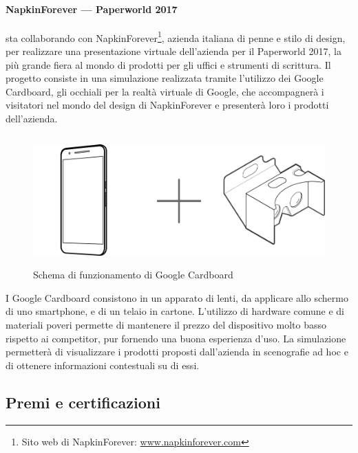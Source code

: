   \paragraph{NapkinForever --- Paperworld 2017}
   \nomeAzienda{} sta collaborando con NapkinForever\footnote{Sito web di NapkinForever: \href{www.napkinforever.com}{www.napkinforever.com}}, azienda italiana di penne e stilo di design, per realizzare una presentazione virtuale dell'azienda per il Paperworld 2017, la più grande fiera al mondo di prodotti per gli uffici e strumenti di scrittura. Il progetto consiste in una simulazione realizzata tramite l'utilizzo dei Google Cardboard, gli occhiali per la realtà virtuale di Google, che accompagnerà i visitatori nel mondo del design di NapkinForever e presenterà loro i prodotti dell'azienda.
   \begin{figure}[H]
      \begin{center}
         \includegraphics[width=15cm,height=5cm,keepaspectratio]{immagini/cardboard-schema}
      \end{center}
      \caption{Schema di funzionamento di Google Cardboard}\label{schemacardboard}
   \end{figure}
   I Google Cardboard consistono in un apparato di lenti, da applicare allo schermo di uno smartphone, e di un telaio in cartone. L'utilizzo di hardware comune e di materiali poveri permette di mantenere il prezzo del dispositivo molto basso rispetto ai competitor, pur fornendo una buona esperienza d'uso. La simulazione permetterà di visualizzare i prodotti proposti dall'azienda in scenografie ad hoc e di ottenere informazioni contestuali su di essi.

   \subsection{Premi e certificazioni}

